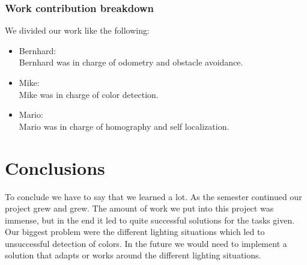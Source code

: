 \documentclass[703030]{./includes/iisreport}
\begin{document}
  \subsubsection{Work contribution breakdown}
  We divided our work like the following:
  
  \begin{itemize}
  	\item Bernhard: \\
  	Bernhard was in charge of odometry and obstacle avoidance.
  	
  	\item Mike: \\
  	Mike was in charge of color detection.
  	
  	\item Mario: \\
  	Mario was in charge of homography and self localization.
  \end{itemize}

\section{Conclusions}
To conclude we have to say that we learned a lot. As the semester continued our project grew and grew.
The amount of work we put into this project was immense, but in the end it led to quite successful
solutions for the tasks given. Our biggest problem were the different lighting situations which led to
unsuccessful detection of colors. In the future we would need to implement a solution that adapts or
works around the different lighting situations.



\end{document}
